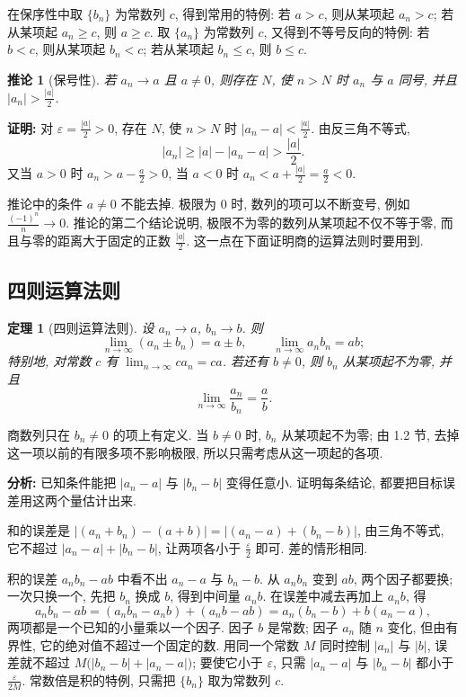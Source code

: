 \documentclass[UTF8,openany]{ctexbook}
\theoremstyle{chinesetextbook}
\newtheorem{theorem}{定理}[section]
\newenvironment{cnproof}{\par\indent\textbf{证明:} \ignorespaces}{\par}
\newtheorem*{corollarysingle}{推论}
\begin{document}
在保序性中取 $\{b_n\}$ 为常数列 $c$, 得到常用的特例: 若 $a>c$, 则从某项起 $a_n>c$; 若从某项起 $a_n\ge c$, 则 $a\ge c$. 取 $\{a_n\}$ 为常数列 $c$, 又得到不等号反向的特例: 若 $b<c$, 则从某项起 $b_n<c$; 若从某项起 $b_n\le c$, 则 $b\le c$.
\begin{corollarysingle}[保号性]
若 $a_n\to a$ 且 $a\ne0$, 则存在 $N$, 使 $n>N$ 时 $a_n$ 与 $a$ 同号, 并且 $\displaystyle|a_n|>\frac{|a|}2$.
\end{corollarysingle}
\begin{cnproof}
对 $\displaystyle\varepsilon=\frac{|a|}2>0$, 存在 $N$, 使 $n>N$ 时 $\displaystyle|a_n-a|<\frac{|a|}2$. 由反三角不等式,
\[
|a_n|\ge|a|-|a_n-a|>\frac{|a|}2.
\]
又当 $a>0$ 时 $\displaystyle a_n>a-\frac a2>0$, 当 $a<0$ 时 $\displaystyle a_n<a+\frac{|a|}2=\frac a2<0$.
\end{cnproof}
推论中的条件 $a\ne0$ 不能去掉. 极限为 $0$ 时, 数列的项可以不断变号, 例如 $\displaystyle\frac{(-1)^n}n\to0$. 推论的第二个结论说明, 极限不为零的数列从某项起不仅不等于零, 而且与零的距离大于固定的正数 $\displaystyle\frac{|a|}2$. 这一点在下面证明商的运算法则时要用到.
\subsection{四则运算法则}
\begin{theorem}[四则运算法则]
设 $a_n\to a$, $b_n\to b$. 则
\[
\lim_{n\to\infty}(a_n\pm b_n)=a\pm b,\qquad \lim_{n\to\infty}a_nb_n=ab;
\]
特别地, 对常数 $c$ 有 $\displaystyle\lim_{n\to\infty}ca_n=ca$. 若还有 $b\ne0$, 则 $b_n$ 从某项起不为零, 并且
\[
\lim_{n\to\infty}\frac{a_n}{b_n}=\frac ab.
\]
\end{theorem}
商数列只在 $b_n\ne0$ 的项上有定义. 当 $b\ne0$ 时, $b_n$ 从某项起不为零; 由 1.2 节, 去掉这一项以前的有限多项不影响极限, 所以只需考虑从这一项起的各项.

\par\indent\textbf{分析:} 已知条件能把 $|a_n-a|$ 与 $|b_n-b|$ 变得任意小. 证明每条结论, 都要把目标误差用这两个量估计出来.

和的误差是 $|(a_n+b_n)-(a+b)|=|(a_n-a)+(b_n-b)|$, 由三角不等式, 它不超过 $|a_n-a|+|b_n-b|$, 让两项各小于 $\displaystyle\frac\varepsilon2$ 即可. 差的情形相同.

积的误差 $a_nb_n-ab$ 中看不出 $a_n-a$ 与 $b_n-b$. 从 $a_nb_n$ 变到 $ab$, 两个因子都要换; 一次只换一个, 先把 $b_n$ 换成 $b$, 得到中间量 $a_nb$. 在误差中减去再加上 $a_nb$, 得
\[
a_nb_n-ab=(a_nb_n-a_nb)+(a_nb-ab)=a_n(b_n-b)+b(a_n-a),
\]
两项都是一个已知的小量乘以一个因子. 因子 $b$ 是常数; 因子 $a_n$ 随 $n$ 变化, 但由有界性, 它的绝对值不超过一个固定的数. 用同一个常数 $M$ 同时控制 $|a_n|$ 与 $|b|$, 误差就不超过 $M\bigl(|b_n-b|+|a_n-a|\bigr)$; 要使它小于 $\varepsilon$, 只需 $|a_n-a|$ 与 $|b_n-b|$ 都小于 $\displaystyle\frac\varepsilon{2M}$. 常数倍是积的特例, 只需把 $\{b_n\}$ 取为常数列 $c$.
\end{document}
